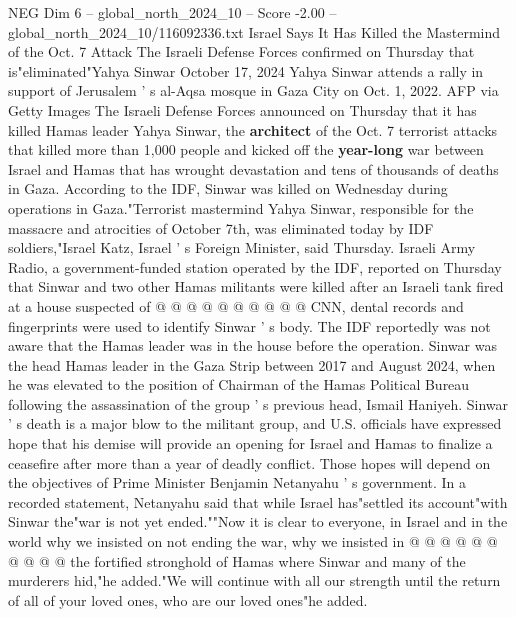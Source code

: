 \begin{textsample}{NEG Dim 6 – global\_north\_2024\_10 – Score -2.00 – global\_north\_2024\_10/116092336.txt}  \label{ex:f6_neg_047}
Israel Says It Has Killed the Mastermind of the Oct. 7 Attack The Israeli Defense Forces confirmed on Thursday that is"eliminated"Yahya Sinwar October 17, 2024 Yahya Sinwar attends a rally in support of Jerusalem ' s al-Aqsa mosque in Gaza City on Oct. 1, 2022.
AFP via Getty Images The Israeli Defense Forces announced on Thursday that it has killed Hamas leader Yahya Sinwar, the \textbf{architect} of the Oct. 7 terrorist attacks that killed more than 1,000 people and kicked off the \textbf{year-long} war between Israel and Hamas that has wrought devastation and tens of thousands of deaths in Gaza.
According to the IDF, Sinwar was killed on Wednesday during operations in Gaza."Terrorist mastermind Yahya Sinwar, responsible for the massacre and atrocities of October 7th, was eliminated today by IDF soldiers,"Israel Katz, Israel ' s Foreign Minister, said Thursday.
Israeli Army Radio, a government-funded station operated by the IDF, reported on Thursday that Sinwar and two other Hamas militants were killed after an Israeli tank fired at a house suspected of @ @ @ @ @ @ @ @ @ @ CNN, dental records and fingerprints were used to identify Sinwar ' s body.
The IDF reportedly was not aware that the Hamas leader was in the house before the operation.
Sinwar was the head Hamas leader in the Gaza Strip between 2017 and August 2024, when he was elevated to the position of Chairman of the Hamas Political Bureau following the assassination of the group ' s previous head, Ismail Haniyeh.
Sinwar ' s death is a major blow to the militant group, and U.S. officials have expressed hope that his demise will provide an opening for Israel and Hamas to finalize a ceasefire after more than a year of deadly conflict.
Those hopes will depend on the objectives of Prime Minister Benjamin Netanyahu ' s government.
In a recorded statement, Netanyahu said that while Israel has"settled its account"with Sinwar the"war is not yet ended.""Now it is clear to everyone, in Israel and in the world why we insisted on not ending the war, why we insisted in @ @ @ @ @ @ @ @ @ @ the fortified stronghold of Hamas where Sinwar and many of the murderers hid,"he added."We will continue with all our strength until the return of all of your loved ones, who are our loved ones"he added.

\end{textsample}
